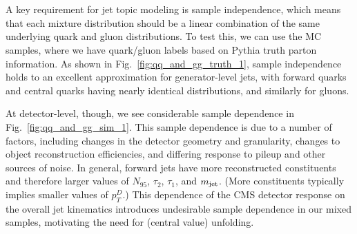 \documentclass[aps,prd,twocolumn,preprintnumbers,nofootinbib,longbibliography,floatfix]{revtex4-1}
\DeclareRobustCommand{\Fig}[1]{Fig.~\ref{#1}}
\newcommand{\Pythia}{{\sc Pythia}\xspace}
\newcommand{\cor}[1]{#1}
\begin{document}
\begin{figure*}[p]
\centering
{}
\\
%
\\
%
\caption{Similar to \Fig{fig:qq_and_gg_truth_1} but now for detector-level distributions after \Pythia events are passed through the CMS detector simulation.
%
We see that quark jets (cyan) and gluon jets (orange) look different in the forward and central parts of the CMS detector, which violates the assumption of sample independence and necessitates the use of unfolding.
}
\label{fig:qq_and_gg_sim_1}
\end{figure*}

A key requirement for jet topic modeling is sample independence, which means that each mixture distribution should be a linear combination of the same underlying quark and gluon distributions.
%
To test this, we can use the MC samples, where we have quark/gluon labels based on \Pythia truth parton information.
%
As shown in \Fig{fig:qq_and_gg_truth_1}, sample independence holds to an excellent approximation for generator-level jets, with forward quarks and central quarks having nearly identical distributions, and similarly for gluons.


At detector-level, though, we see considerable sample dependence in \Fig{fig:qq_and_gg_sim_1}.
%
\cor{This sample dependence is due to a number of factors, including changes in the detector geometry and granularity, changes to object reconstruction efficiencies, and differing response to pileup and other sources of noise.}
%
In general, forward jets have more reconstructed constituents and therefore larger values of $N_{95}$, $\tau_2$, $\tau_1$, and $m_{\rm jet}$.
%
(More constituents typically implies smaller values of $p_T^D$.)
%
This dependence of the CMS detector response on the overall jet kinematics introduces undesirable sample dependence in our mixed samples, motivating the need for (central value) unfolding.
\end{document}
